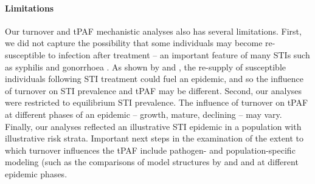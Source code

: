 \paragraph{Limitations}		%

Our turnover and tPAF mechanistic analyses also has several limitations.
First, we did not capture the possibility that some individuals may become
re-susceptible to infection after treatment
-- an important feature of many STIs such as syphilis and gonorrhoea
\citep{Fenton2008}.
As shown by \citet{Fenton2008} and \citet{Pourbohloul2003},
the re-supply of susceptible individuals following STI treatment
could fuel an epidemic, and so the influence of turnover on
STI prevalence and tPAF may be different.
Second, our analyses were restricted to equilibrium STI prevalence.
The influence of turnover on tPAF at different phases of an epidemic
-- growth, mature, declining --									%
may vary. Finally, our analyses reflected an illustrative STI epidemic
in a population with illustrative risk strata.
Important next steps in the examination of the extent to which turnover influences the tPAF include
pathogen- and population-specific modeling (such as the comparisons of model structures 
by \citet{Johnson2016} and %
and at different epidemic phases.


